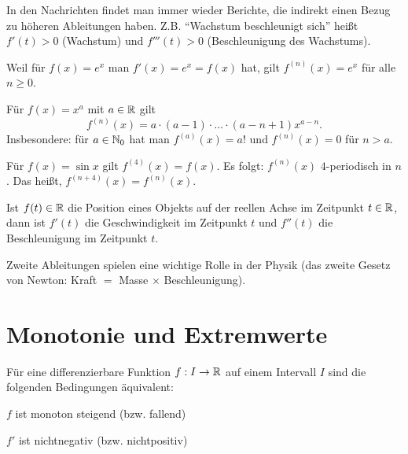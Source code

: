\begin{bem}
	In den Nachrichten findet man immer wieder Berichte, die indirekt einen Bezug zu höheren Ableitungen haben. Z.B. ``Wachstum beschleunigt sich'' heißt $f'(t)>0$ (Wachstum) und $f'''(t)>0$ (Beschleunigung des Wachstums). 
\end{bem} 

\begin{bsp} 
	Weil für $f(x)=e^x$ man $f'(x) = e^x = f(x)$ hat, gilt $f^{(n)}(x) = e^x$ für alle $n \ge 0$. 
\end{bsp} 

\begin{bsp} 
	Für $f(x) = x^a$ mit $a \in \mathbb{R}$ gilt 
	\[
		f^{(n)}(x) = a \cdot (a-1) \cdot \ldots \cdot (a-n+1) x^{a-n}. 
	\]
	Insbesondere: für $a \in \mathbb{N}_0$ hat man $f^{(a)}(x) = a!$ und $f^{(n)}(x)=0$ für $n > a$. 
\end{bsp} 

\begin{bsp} 
	Für $f(x) = \sin x$ gilt $f^{(4)}(x) = f(x)$. Es folgt: $f^{(n)}(x)$ $4$-periodisch in $n$. Das heißt, $f^{(n+4)}(x) = f^{(n)}(x)$. 
\end{bsp} 



\begin{bem} 
	Ist $f(t) \in \mathbb{R}$ die Position eines Objekts auf der reellen Achse im Zeitpunkt $t \in \mathbb{R}$, dann ist $f'(t)$ die Geschwindigkeit im Zeitpunkt $t$ und $f''(t)$ die Beschleunigung im Zeitpunkt $t$. 
	
	Zweite Ableitungen spielen eine wichtige Rolle in der Physik (das zweite Gesetz von Newton: Kraft $=$ Masse $\times$ Beschleunigung). 
\end{bem} 

\section{Monotonie und Extremwerte} 


\begin{thm} Für eine differenzierbare Funktion $f: I \to \mathbb{R}$  auf einem Intervall $I$ sind die folgenden Bedingungen äquivalent: 
	\begin{enumi} 
		\item $f$ ist monoton steigend (bzw. fallend) 
		\item $f'$ ist nichtnegativ (bzw. nichtpositiv) 
	\end{enumi} 
\end{thm} 

